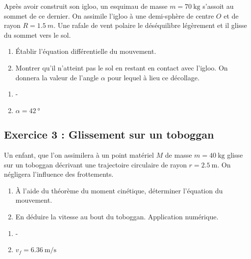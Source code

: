 Après avoir construit son igloo, un esquimau de masse $m = \SI{70}{\kilogram}$ s'assoit au sommet de ce dernier. On assimile l'igloo à une demi-sphère de centre $O$ et de rayon $R = \SI{1.5}{m}$. Une rafale de vent polaire le déséquilibre légèrement et il glisse du sommet vers le sol. 

\begin{enumerate}
	\item Établir l'équation différentielle du mouvement.
	\item Montrer qu'il n'atteint pas le sol en restant en contact avec l'igloo. On donnera la valeur de l'angle $\alpha$ pour lequel à lieu ce décollage.
\end{enumerate}

\begin{enumerate}
	\item -
	\item $\alpha = \SI{42}{\degree}$
\end{enumerate}

\subsection{Exercice 3 : Glissement sur un toboggan}

Un enfant, que l'on assimilera à un point matériel $M$ de masse $m = \SI{40}{\kilogram}$ glisse sur un toboggan décrivant une trajectoire circulaire de rayon $r = \SI{2.5}{\meter}$. On négligera l'influence des frottements.

\begin{enumerate}
	\item À l'aide du théorème du moment cinétique, déterminer l'équation du mouvement.
	\item En déduire la vitesse au bout du toboggan. Application numérique.
\end{enumerate}

\begin{enumerate}
	\item -
	\item $v_f = \SI{6.36}{\meter\per\second}$
\end{enumerate}
